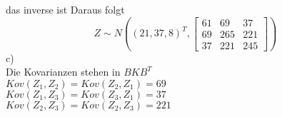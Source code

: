 \documentclass{article}
\begin{document}
	das inverse ist
	Daraus folgt\\
	\[Z\sim N((21,37,8)^T, \begin{bmatrix}61&69&37\\69&265&221\\37&221&245\end{bmatrix})\]
	c)\\
	Die Kovarianzen stehen in $BKB^T$\\
	$Kov(Z_1,Z_2)=Kov(Z_2,Z_1)=69$\\
	$Kov(Z_1,Z_3)=Kov(Z_3,Z_1)=37$\\
	$Kov(Z_2,Z_3)=Kov(Z_2,Z_3)=221$\\
	
\end{document}
